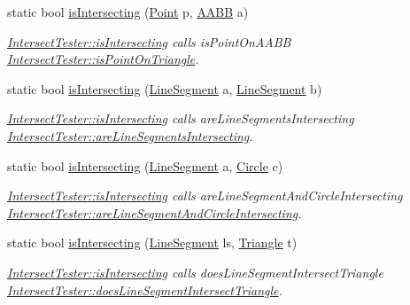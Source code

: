 \begin{DoxyCompactItemize}
static bool \hyperlink{class_intersect_tester_a29619798894f9997823c27e73f53236d}{is\+Intersecting} (\hyperlink{class_point}{Point} p, \hyperlink{class_a_a_b_b}{A\+A\+BB} a)
\begin{DoxyCompactList}\small\item\em \hyperlink{class_intersect_tester_a7710e17ff7d2e229059f23b9429213f5}{Intersect\+Tester\+::is\+Intersecting} calls is\+Point\+On\+A\+A\+BB  \hyperlink{class_intersect_tester_a04fb92f5e4c68c3f3a91321b94c6011f}{Intersect\+Tester\+::is\+Point\+On\+Triangle}. \end{DoxyCompactList}\item 
static bool \hyperlink{class_intersect_tester_a7984196b3e057a2c02a8f2a8d55847e0}{is\+Intersecting} (\hyperlink{class_line_segment}{Line\+Segment} a, \hyperlink{class_line_segment}{Line\+Segment} b)
\begin{DoxyCompactList}\small\item\em \hyperlink{class_intersect_tester_a7710e17ff7d2e229059f23b9429213f5}{Intersect\+Tester\+::is\+Intersecting} calls are\+Line\+Segments\+Intersecting  \hyperlink{class_intersect_tester_a0552b121b444528907c1958c02fb217b}{Intersect\+Tester\+::are\+Line\+Segments\+Intersecting}. \end{DoxyCompactList}\item 
static bool \hyperlink{class_intersect_tester_ab2cc7dc060f09e9bf33b197de8ca6f16}{is\+Intersecting} (\hyperlink{class_line_segment}{Line\+Segment} a, \hyperlink{class_circle}{Circle} c)
\begin{DoxyCompactList}\small\item\em \hyperlink{class_intersect_tester_a7710e17ff7d2e229059f23b9429213f5}{Intersect\+Tester\+::is\+Intersecting} calls are\+Line\+Segment\+And\+Circle\+Intersecting  \hyperlink{class_intersect_tester_a36c9fcad6ad5607f5a47369aeb2b57c3}{Intersect\+Tester\+::are\+Line\+Segment\+And\+Circle\+Intersecting}. \end{DoxyCompactList}\item 
static bool \hyperlink{class_intersect_tester_aa7f33e35eaa5d3662fc8a57e99eff82f}{is\+Intersecting} (\hyperlink{class_line_segment}{Line\+Segment} ls, \hyperlink{class_triangle}{Triangle} t)
\begin{DoxyCompactList}\small\item\em \hyperlink{class_intersect_tester_a7710e17ff7d2e229059f23b9429213f5}{Intersect\+Tester\+::is\+Intersecting} calls does\+Line\+Segment\+Intersect\+Triangle  \hyperlink{class_intersect_tester_a7e7603c33cc5921adb9d0d24eb76ebc9}{Intersect\+Tester\+::does\+Line\+Segment\+Intersect\+Triangle}. \end{DoxyCompactList}\item 

\end{DoxyCompactItemize}

